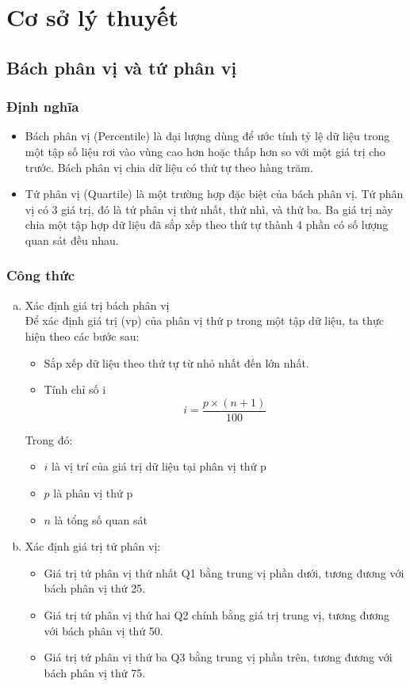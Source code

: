 \documentclass[a4paper]{article}
\theoremstyle{definition}
\begin{document}
\section{Cơ sở lý thuyết}\label{theory}
\subsection{ Bách phân vị và tứ phân vị}
\subsubsection{Định nghĩa}
\begin{itemize}
    \item Bách phân vị (Percentile) là đại lượng dùng để ước tính tỷ lệ dữ liệu trong một tập số liệu rơi vào vùng cao hơn hoặc thấp hơn so với một giá trị cho trước. Bách phân vị chia dữ liệu có thứ tự theo hàng trăm.
    \item Tứ phân vị (Quartile) là một trường hợp đặc biệt của bách phân vị. Tứ phân vị có 3 giá trị, đó là tứ phân vị thứ nhất, thứ nhì, và thứ ba. Ba giá trị này chia một tập hợp dữ liệu đã sắp xếp theo thứ tự thành 4 phần có số lượng quan sát đều nhau.
\end{itemize}
\subsubsection{Công thức}
\begin{enumerate}[a)]
    
 \item Xác định giá trị bách phân vị\\
Để xác định giá trị (vp) của phân vị thứ p trong một tập dữ liệu, ta thực hiện theo các bước sau:
\begin{itemize}
    \item Sắp xếp dữ liệu theo thứ tự từ nhỏ nhất đến lớn nhất.
    \item Tính chỉ số i
    $$
i=\frac{p \times(n+1)}{100}
$$
\end{itemize}
Trong đó:
\begin{itemize}
    \item $i$ là vị trí của giá trị dữ liệu tại phân vị thứ p
    \item $p$ là phân vị thứ p
    \item $n$ là tổng số quan sát
\end{itemize}
 \item Xác định giá trị tứ phân vị:
\begin{itemize}
    \item Giá trị tứ phân vị thứ nhất Q1 bằng trung vị phần dưới, tương đương với bách phân vị thứ 25.
    \item Giá trị tứ phân vị thứ hai Q2 chính bằng giá trị trung vị, tương đương với bách phân vị thứ 50.
    \item Giá trị tứ phân vị thứ ba Q3 bằng trung vị phần trên, tương đương với bách phân vị thứ 75.
\end{itemize}
\end{enumerate}
\end{document}
